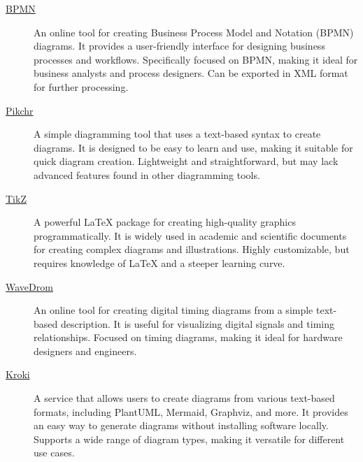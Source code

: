 \documentclass[a4paper,twoside]{article}
\begin{document}
\begin{description}
\item[{\href{https://demo.bpmn.io/new}{BPMN}}] An online tool for creating Business Process Model and Notation (BPMN) diagrams. It provides a user-friendly interface for designing business processes and workflows. Specifically focused on BPMN, making it ideal for business analysts and process designers. Can be exported in XML format for further processing.
\item[{\href{https://pikchr.org/}{Pikchr}}] A simple diagramming tool that uses a text-based syntax to create diagrams. It is designed to be easy to learn and use, making it suitable for quick diagram creation. Lightweight and straightforward, but may lack advanced features found in other diagramming tools.
\item[{\href{https://tikz.dev/}{TikZ}}] A powerful \LaTeX{} package for creating high-quality graphics programmatically. It is widely used in academic and scientific documents for creating complex diagrams and illustrations. Highly customizable, but requires knowledge of \LaTeX{} and a steeper learning curve.
\item[{\href{https://wavedrom.com/}{WaveDrom}}] An online tool for creating digital timing diagrams from a simple text-based description. It is useful for visualizing digital signals and timing relationships. Focused on timing diagrams, making it ideal for hardware designers and engineers.
\item[{\href{https://kroki.io/}{Kroki}}] A service that allows users to create diagrams from various text-based formats, including PlantUML, Mermaid, Graphviz, and more. It provides an easy way to generate diagrams without installing software locally. Supports a wide range of diagram types, making it versatile for different use cases.
\end{description}
\end{document}
